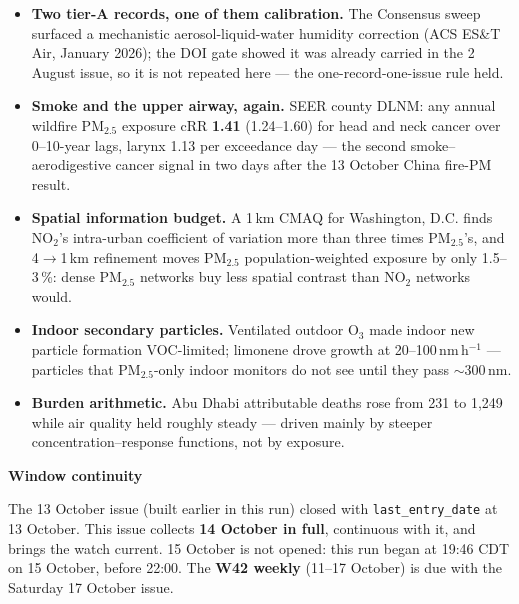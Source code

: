 \documentclass[10pt]{article}
\begin{document}
\footnotesize
\begin{itemize}

\item \textbf{Two tier-A records, one of them calibration.} The Consensus sweep surfaced a mechanistic
aerosol-liquid-water humidity correction (ACS ES\&T Air, January 2026); the DOI gate showed it was already carried
in the 2 August issue, so it is not repeated here --- the one-record-one-issue rule held.

\item \textbf{Smoke and the upper airway, again.} SEER county DLNM: any annual wildfire PM$_{2.5}$ exposure cRR
\textbf{1.41} (1.24--1.60) for head and neck cancer over 0--10-year lags, larynx 1.13 per exceedance day --- the
second smoke--aerodigestive cancer signal in two days after the 13 October China fire-PM result.

\item \textbf{Spatial information budget.} A 1\,km CMAQ for Washington, D.C. finds NO$_2$'s intra-urban
coefficient of variation more than three times PM$_{2.5}$'s, and 4$\to$1\,km refinement moves PM$_{2.5}$
population-weighted exposure by only 1.5--3\,\%: dense PM$_{2.5}$ networks buy less spatial contrast than NO$_2$
networks would.

\item \textbf{Indoor secondary particles.} Ventilated outdoor O$_3$ made indoor new particle formation VOC-limited;
limonene drove growth at 20--100\,nm\,h$^{-1}$ --- particles that PM$_{2.5}$-only indoor monitors do not see until
they pass $\sim$300\,nm.

\item \textbf{Burden arithmetic.} Abu Dhabi attributable deaths rose from 231 to 1,249 while air quality held
roughly steady --- driven mainly by steeper concentration--response functions, not by exposure.

\end{itemize}

\vspace{2mm}

\begin{keybox}
{\sffamily\bfseries\footnotesize\color{Deep}Window continuity}\\[1.2mm]
{\fontsize{7.2}{8.8}\selectfont
The 13 October issue (built earlier in this run) closed with \texttt{last\_entry\_date} at 13 October.
This issue collects \textbf{14 October in full}, continuous with it, and brings the watch current. 15 October is
not opened: this run began at 19:46 CDT on 15 October, before 22:00. The \textbf{W42 weekly} (11--17 October)
is due with the Saturday 17 October issue.\par}
\end{keybox}
\end{document}
